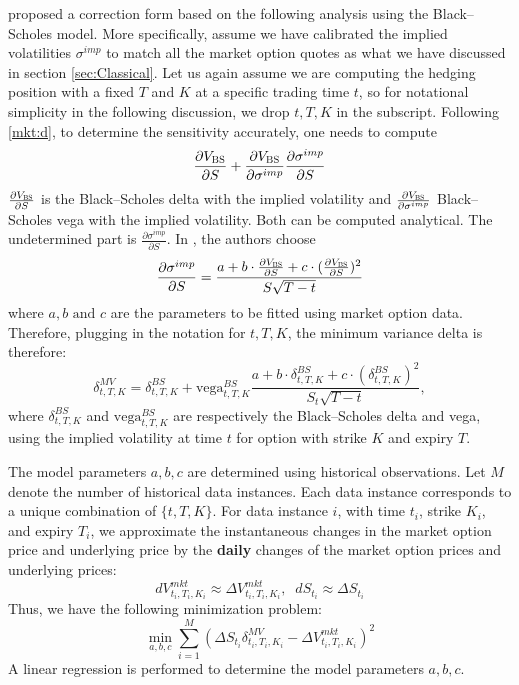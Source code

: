 \documentclass[letterpaper,12pt,titlepage,oneside,final]{book}
\numberwithin{equation}{section}
\theoremstyle{definition}
\newcommand{\BS}{\textsc{BS}}
\newcommand{\Vmkt}{V^{mkt}}
\newcommand{\Smkt}{S}
\newcommand{\MV}{\bf \textsc{MV}}
\begin{document}
\citet{hulloptimal} proposed a correction form  based on the following analysis using the Black–Scholes model. 
More specifically, assume we have calibrated the implied volatilities $\sigma^{imp}$ to match all the market option quotes as what we have discussed in section \ref{sec:Classical}.
Let us again assume we  are computing  the hedging position  with a fixed $T$ and $K$ at a specific trading time $t$, so for notational simplicity in the following discussion, we drop ${t,T,K}$ in the subscript. Following \eqref{mkt:d}, to determine the  sensitivity accurately, one needs to compute 
\begin{equation} \label{eq:Chain}
\frac{\partial V_\BS}{\partial S} + \frac{\partial V_\BS}{\partial \sigma^{imp}}
\frac{\partial \sigma^{imp}}{\partial S}
\end{equation}
$
\frac{\partial V_\BS}{\partial S}
$ is the Black–Scholes delta with the implied volatility and $\frac{\partial V_\BS}{\partial \sigma^{imp}}$ Black–Scholes vega with the implied volatility. Both can be computed analytical. The undetermined part is $\frac{\partial \sigma^{imp}}{\partial S}$.
In \cite{hulloptimal}, the authors choose  
$$
\frac{\partial \sigma^{imp}}{\partial S} =
\frac{a+b \cdot\frac{\partial V_\BS}{\partial S}+c \cdot (\frac{\partial V_\BS}{\partial S})^2}{S \sqrt{T-t}}
$$
where $a, b \text{ and  } c$ are the parameters to be fitted using  market option data. Therefore, plugging in the notation for $t,T,K$,
the minimum variance delta is therefore:
\begin{equation}
\delta^{MV}_{t,T,K}=\delta^{BS}_{t,T,K}+\text{vega}^{BS}_{t,T,K} \frac{a+b \cdot \delta^{BS}_{t,T,K} +c \cdot (\delta^{BS}_{t,T,K})^2}{S_t\sqrt{T-t}},
\label{eq:HullWhite}
\end{equation}
where $\delta^{BS}_{t,T,K}$ and $\text{vega}^{BS}_{t,T,K}$ are respectively the Black–Scholes delta and vega, using the implied volatility at time $t$ for option with strike $K$ and expiry $T$.

The model parameters $a,b,c$ are determined using historical observations.
Let $M$ denote the number of historical data instances. Each data instance corresponds to a unique combination of $\{t,T,K\}$. For data instance $i$, with time $t_i$, strike $K_i$, and expiry $T_i$, we approximate the instantaneous changes in the market option price and underlying price by the \textbf{daily} changes of the market option prices and underlying prices:
\[
    d\Vmkt_{t_i,T_i,K_i} \approx \Delta \Vmkt_{t_i,T_i,K_i},\;\;
    d\Smkt_{t_i} \approx \Delta S_{t_i}
\]
Thus, we have the following minimization problem:
\[
\min_{a,b,c} \sum_{i=1}^M \left(\Delta S_{t_i} \delta^{MV}_{t_i,T_i,K_i} -\Delta \Vmkt_{t_i,T_i,K_i}   \right)^2
\]
A linear regression is performed to determine the model parameters $a,b,c$.
\end{document}
